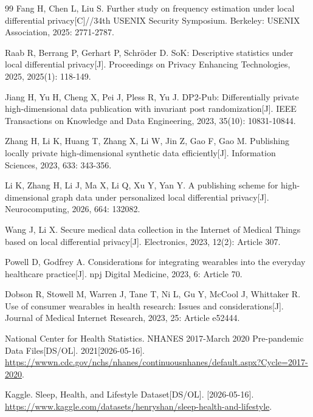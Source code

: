 \documentclass{cumcmthesis}
\numberwithin{equation}{section}
\numberwithin{figure}{section}
\numberwithin{table}{section}
\begin{document}
\begin{thebibliography}{99}
Fang H, Chen L, Liu S. Further study on frequency estimation under local differential privacy[C]//34th USENIX Security Symposium. Berkeley: USENIX Association, 2025: 2771-2787.

Raab R, Berrang P, Gerhart P, Schröder D. SoK: Descriptive statistics under local differential privacy[J]. Proceedings on Privacy Enhancing Technologies, 2025, 2025(1): 118-149.

Jiang H, Yu H, Cheng X, Pei J, Pless R, Yu J. DP2-Pub: Differentially private high-dimensional data publication with invariant post randomization[J]. IEEE Transactions on Knowledge and Data Engineering, 2023, 35(10): 10831-10844.

Zhang H, Li K, Huang T, Zhang X, Li W, Jin Z, Gao F, Gao M. Publishing locally private high-dimensional synthetic data efficiently[J]. Information Sciences, 2023, 633: 343-356.

Li K, Zhang H, Li J, Ma X, Li Q, Xu Y, Yan Y. A publishing scheme for high-dimensional graph data under personalized local differential privacy[J]. Neurocomputing, 2026, 664: 132082.

Wang J, Li X. Secure medical data collection in the Internet of Medical Things based on local differential privacy[J]. Electronics, 2023, 12(2): Article 307.

Powell D, Godfrey A. Considerations for integrating wearables into the everyday healthcare practice[J]. npj Digital Medicine, 2023, 6: Article 70.

Dobson R, Stowell M, Warren J, Tane T, Ni L, Gu Y, McCool J, Whittaker R. Use of consumer wearables in health research: Issues and considerations[J]. Journal of Medical Internet Research, 2023, 25: Article e52444.

National Center for Health Statistics. NHANES 2017-March 2020 Pre-pandemic Data Files[DS/OL]. 2021[2026-05-16]. \url{https://wwwn.cdc.gov/nchs/nhanes/continuousnhanes/default.aspx?Cycle=2017-2020}.

Kaggle. Sleep, Health, and Lifestyle Dataset[DS/OL]. [2026-05-16]. \url{https://www.kaggle.com/datasets/henryshan/sleep-health-and-lifestyle}.

\end{thebibliography}
\end{document}
